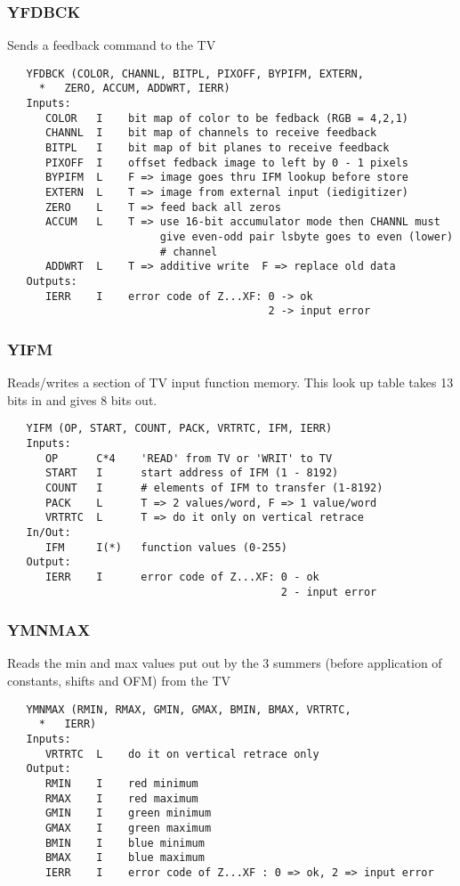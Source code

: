 \subsubsection{YFDBCK}
Sends a feedback command to the TV
\begin{verbatim}
   YFDBCK (COLOR, CHANNL, BITPL, PIXOFF, BYPIFM, EXTERN,
     *   ZERO, ACCUM, ADDWRT, IERR)
   Inputs:
      COLOR   I    bit map of color to be fedback (RGB = 4,2,1)
      CHANNL  I    bit map of channels to receive feedback
      BITPL   I    bit map of bit planes to receive feedback
      PIXOFF  I    offset fedback image to left by 0 - 1 pixels
      BYPIFM  L    F => image goes thru IFM lookup before store
      EXTERN  L    T => image from external input (iedigitizer)
      ZERO    L    T => feed back all zeros
      ACCUM   L    T => use 16-bit accumulator mode then CHANNL must
                        give even-odd pair lsbyte goes to even (lower)
                        # channel
      ADDWRT  L    T => additive write  F => replace old data
   Outputs:
      IERR    I    error code of Z...XF: 0 -> ok
                                         2 -> input error

\end{verbatim}

\subsubsection{YIFM}
Reads/writes a section of TV input function memory.  This
look up table takes 13 bits in and gives 8 bits out.
\begin{verbatim}
   YIFM (OP, START, COUNT, PACK, VRTRTC, IFM, IERR)
   Inputs:
      OP      C*4    'READ' from TV or 'WRIT' to TV
      START   I      start address of IFM (1 - 8192)
      COUNT   I      # elements of IFM to transfer (1-8192)
      PACK    L      T => 2 values/word, F => 1 value/word
      VRTRTC  L      T => do it only on vertical retrace
   In/Out:
      IFM     I(*)   function values (0-255)
   Output:
      IERR    I      error code of Z...XF: 0 - ok
                                           2 - input error

\end{verbatim}

\subsubsection{YMNMAX}
Reads the min and max values put out by the 3 summers (before
application of constants, shifts and OFM) from the TV
\begin{verbatim}
   YMNMAX (RMIN, RMAX, GMIN, GMAX, BMIN, BMAX, VRTRTC,
     *   IERR)
   Inputs:
      VRTRTC  L    do it on vertical retrace only
   Output:
      RMIN    I    red minimum
      RMAX    I    red maximum
      GMIN    I    green minimum
      GMAX    I    green maximum
      BMIN    I    blue minimum
      BMAX    I    blue maximum
      IERR    I    error code of Z...XF : 0 => ok, 2 => input error

\end{verbatim}

